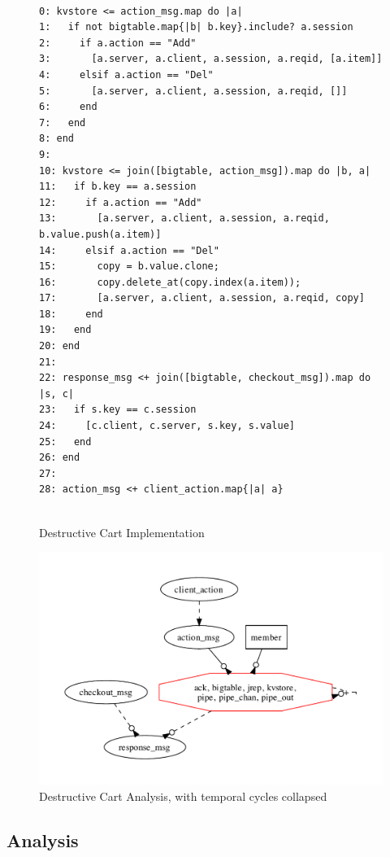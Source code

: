 \begin{figure}[t]
\begin{scriptsize}
\begin{verbatim}

0: kvstore <= action_msg.map do |a|
1:   if not bigtable.map{|b| b.key}.include? a.session
2:     if a.action == "Add"
3:       [a.server, a.client, a.session, a.reqid, [a.item]]
4:     elsif a.action == "Del"
5:       [a.server, a.client, a.session, a.reqid, []]
6:     end
7:   end
8: end
9: 
10: kvstore <= join([bigtable, action_msg]).map do |b, a|
11:   if b.key == a.session
12:     if a.action == "Add"
13:       [a.server, a.client, a.session, a.reqid, b.value.push(a.item)]
14:     elsif a.action == "Del"
15:       copy = b.value.clone;
16:       copy.delete_at(copy.index(a.item));
17:       [a.server, a.client, a.session, a.reqid, copy]
18:     end
19:   end
20: end
21:
22: response_msg <+ join([bigtable, checkout_msg]).map do |s, c|
23:   if s.key == c.session
24:     [c.client, c.server, s.key, s.value]
25:   end
26: end
27: 
28: action_msg <+ client_action.map{|a| a}


\end{verbatim}
\end{scriptsize}
\caption{Destructive Cart Implementation}
\label{tab:pdg-destructive}
\end{figure}

\begin{figure}[t]
\centering
\includegraphics[width=0.9\linewidth]{fig/destructive.pdf}

\caption{Destructive Cart Analysis, with temporal cycles collapsed}
\label{tab:pdg-destructive-analysis}
\end{figure}


\subsection{Analysis}

